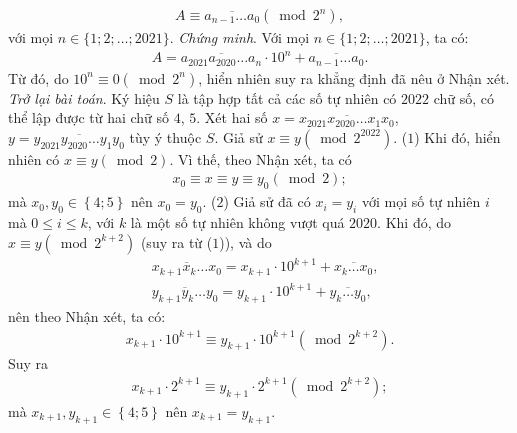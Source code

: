 \begin{multicols}{2}
	\begin{align*}
		A \equiv \overline {{a_{n - 1}} \ldots {a_0}} \left( {\bmod {2^n}} \right),
	\end{align*}
	với mọi $n \in \{1; 2; \ldots; 2021\}$.
	\vskip 0.05cm
	\textit{Chứng minh}. Với mọi $n \in \{1; 2; \ldots; 2021\}$, ta có:
	\begin{align*}
		A = \overline {{a_{2021}}{a_{2020}} \ldots {a_n}}  \cdot {10^n} + \overline {{a_{n - 1}} \ldots {a_0}} .
	\end{align*}
	Từ đó, do  ${10^n} \equiv 0\left( {\bmod {2^n}} \right)$, hiển nhiên suy ra khẳng định đã nêu ở Nhận xét.
	\vskip 0.05cm
	\textit{Trở lại bài toán}.
	\vskip 0.05cm
	Ký hiệu $S$ là tập hợp tất cả các số tự nhiên có $2022$ chữ số, có thể lập được từ hai chữ số $4$, $5$.
	\vskip 0.05cm
	Xét hai số $x = \overline {{x_{2021}}{x_{2020}} \ldots {x_1}{x_0}} $,\linebreak $y = \overline {{y_{2021}}{y_{2020}} \ldots {y_1}{y_0}} $  tùy ý thuộc $S$.
	\vskip 0.05cm
	Giả sử $x \equiv y\left( {\bmod {2^{2022}}} \right)$. \hfill ($1$)
	\vskip 0.05cm
	Khi đó, hiển nhiên có $x \equiv y\left( {\bmod 2} \right)$.  Vì thế, theo Nhận xét, ta có
	\begin{align*}
		{x_0} \equiv x \equiv y \equiv {y_0}\left( {\bmod 2} \right);
	\end{align*}
	mà ${x_0},{y_0} \in \left\{ {4;5} \right\}$ nên $x_0 = y_0$. \hfill ($2$)
	\vskip 0.05cm         
	Giả sử đã có  ${x_i} = {y_i}$ với mọi số tự nhiên $i$ mà $0 \le i \le k$, với $k$ là một số tự nhiên không vượt quá $2020$. Khi đó, do \linebreak$x \equiv y\left( {\bmod {2^{k + 2}}} \right)$  (suy ra từ ($1$)), và do
	\begin{align*}
		&\overline {{x_{k + 1}}{x_k} \ldots {x_0}}  = {x_{k + 1}} \cdot {10^{k + 1}} + \overline {{x_k} \ldots {x_0}} ,\\
		&\overline {{y_{k + 1}}{y_k} \ldots {y_0}}  = {y_{k + 1}} \cdot {10^{k + 1}} + \overline {{y_k} \ldots {y_0}} ,
	\end{align*}
	nên theo Nhận xét, ta có:
	\begin{align*}
		{x_{k + 1}} \cdot {10^{k + 1}} \equiv {y_{k + 1}} \cdot {10^{k + 1}}\left( {\bmod {2^{k + 2}}} \right).
	\end{align*}
	Suy ra
	\begin{align*}
		{x_{k + 1}} \cdot {2^{k + 1}} \equiv {y_{k + 1}} \cdot {2^{k + 1}}\left( {\bmod {2^{k + 2}}} \right);
	\end{align*}
	mà ${x_{k + 1}},{y_{k + 1}} \in \left\{ {4;5} \right\}$ nên  ${x_{k + 1}} = {y_{k + 1}}$.

\end{multicols}
